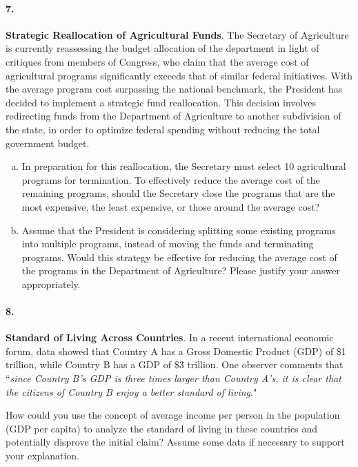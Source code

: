 \documentclass{article}
\begin{document}
\paragraph{7.} \textbf{Strategic Reallocation of Agricultural Funds}. The Secretary of Agriculture is currently reassessing the budget allocation of the department in light of critiques from members of Congress, who claim that the average cost of agricultural programs significantly exceeds that of similar federal initiatives. With the average program cost surpassing the national benchmark, the President has decided to implement a strategic fund reallocation. This decision involves redirecting funds from the Department of Agriculture to another subdivision of the state, in order to optimize federal spending without reducing the total government budget.

\begin{enumerate}[a)]
    \item In preparation for this reallocation, the Secretary must select 10 agricultural programs for termination. To effectively reduce the average cost of the remaining programs, should the Secretary close the programs that are the most expensive, the least expensive, or those around the average cost?
    \item Assume that the President is considering splitting some existing programs into multiple programs, instead of moving the funds and terminating programs. Would this strategy be effective for reducing the average cost of the programs in the Department of Agriculture? Please justify your answer appropriately.
\end{enumerate}

\paragraph{8.} \textbf{Standard of Living Across Countries}. In a recent international economic forum, data showed that Country A has a Gross Domestic Product (GDP) of \$1 trillion, while Country B has a GDP of \$3 trillion. One observer comments that ``\emph{since Country B's GDP is three times larger than Country A's, it is clear that the citizens of Country B enjoy a better standard of living}."
\par How could you use the concept of average income per person in the population (GDP per capita) to analyze the standard of living in these countries and potentially disprove the initial claim? Assume some data if necessary to support your explanation.
\end{document}
